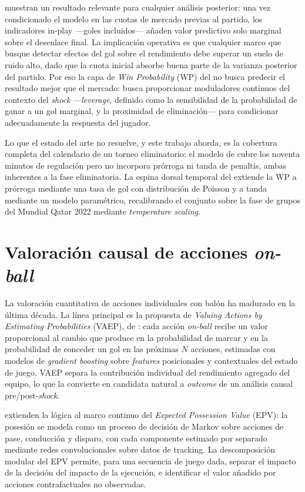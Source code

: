 \textcite{Klemp2021} muestran un resultado relevante para cualquier
análisis posterior: una vez condicionado el modelo en las cuotas de
mercado previas al partido, los indicadores in-play
---goles incluidos--- añaden valor predictivo solo marginal sobre el
desenlace final. La implicación operativa es que cualquier marco que
busque detectar efectos del gol sobre el rendimiento debe superar un
suelo de ruido alto, dado que la cuota inicial absorbe buena parte de
la varianza posterior del partido. Por eso la capa de
\textit{Win Probability} (WP) del \CCV no busca predecir el resultado
mejor que el mercado: busca proporcionar moduladores continuos del
contexto del \textit{shock} ---\textit{leverage}, definido como la
sensibilidad de la probabilidad de ganar a un gol marginal, y la
proximidad de eliminación--- para condicionar adecuadamente la
respuesta del jugador.

Lo que el estado del arte no resuelve, y este trabajo aborda, es la
cobertura completa del calendario de un torneo eliminatorio: el modelo
de \citeauthor{Robberechts2021WP} cubre los noventa minutos de
regulación pero no incorpora prórroga ni tanda de penaltis, ambas
inherentes a la fase eliminatoria. La espina dorsal temporal del \CCV
extiende la WP a prórroga mediante una tasa de gol con distribución
de Poisson y a tanda mediante un modelo paramétrico, recalibrando el
conjunto sobre la fase de grupos del Mundial Qatar 2022 mediante
\textit{temperature scaling}.


\section{Valoración causal de acciones \textit{on-ball}}
\label{sec:sota-onball}

La valoración cuantitativa de acciones individuales con balón ha
madurado en la última década. La línea principal es la propuesta de
\textit{Valuing Actions by Estimating Probabilities} (VAEP), de
\textcite{Decroos2019VAEP}: cada acción \textit{on-ball} recibe un valor
proporcional al cambio que produce en la probabilidad de marcar y en la
probabilidad de conceder un gol en las próximas $N$ acciones, estimadas
con modelos de \textit{gradient boosting} sobre \textit{features}
posicionales y contextuales del estado de juego. VAEP separa la
contribución individual del rendimiento agregado del equipo, lo que la
convierte en candidata natural a \textit{outcome} de un análisis causal
pre/post-\textit{shock}.

\textcite{Fernandez2021EPV} extienden la lógica al marco continuo del
\textit{Expected Possession Value} (EPV): la posesión se modela como
un proceso de decisión de Markov sobre acciones de pase, conducción y
disparo, con cada componente estimado por separado mediante redes
convolucionales sobre datos de tracking. La descomposición modular del
EPV permite, para una secuencia de juego dada, separar el impacto de
la decisión del impacto de la ejecución, e identificar el valor añadido
por acciones contrafactuales no observadas.

